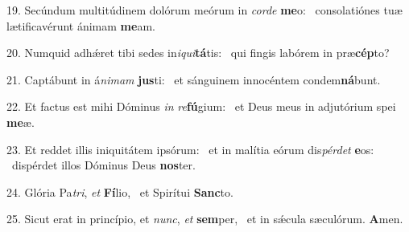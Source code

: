19. Secúndum multitúdinem dolórum meórum in \textit{cor}\textit{de} \textbf{me}o: \ast\  consolatiónes tuæ lætificavérunt ánimam \textbf{me}am.\

20. Numquid adhǽret tibi sedes in\textit{i}\textit{qui}\textbf{tá}tis: \ast\  qui fingis labórem in præ\textbf{cép}to?\

21. Captábunt in á\textit{ni}\textit{mam} \textbf{jus}ti: \ast\  et sánguinem innocéntem condem\textbf{ná}bunt.\

22. Et factus est mihi Dóminus \textit{in} \textit{re}\textbf{fú}gium: \ast\  et Deus meus in adjutórium spei \textbf{me}æ.\

23. Et reddet illis iniquitátem ipsórum: \dag\  et in malítia eórum dis\textit{pér}\textit{det} \textbf{e}os: \ast\  dispérdet illos Dóminus Deus \textbf{nos}ter.\

24. Glória Pa\textit{tri}, \textit{et} \textbf{Fí}lio, \ast\  et Spirítui \textbf{Sanc}to.\

25. Sicut erat in princípio, et \textit{nunc}, \textit{et} \textbf{sem}per, \ast\  et in sǽcula sæculórum. \textbf{A}men.\

